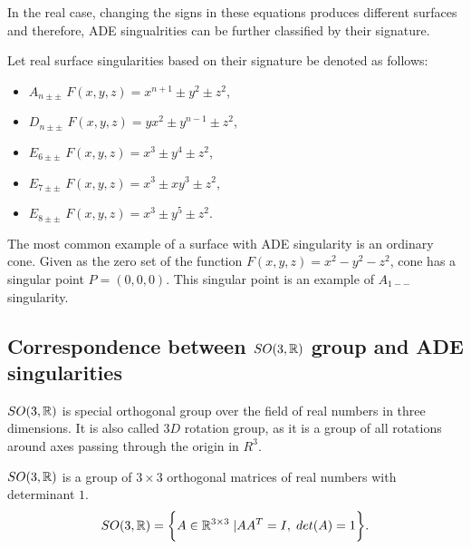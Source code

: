 In the real case, changing the signs in these equations produces different
surfaces and therefore, ADE singualrities can be further classified by their
signature.

\begin{definition}
    Let real surface singularities based on their signature be denoted as follows:
    \begin{itemize}
        \item $A_{n\pm\pm}$ \hspace{5mm} $F(x,y,z)=x^{n+1}\pm y^2\pm z^2$,
              
        \item $D_{n\pm\pm}$ \hspace{5mm} $F(x,y,z)=yx^2\pm y^{n-1}\pm z^2$,
        
        \item $E_{6\pm\pm}$ \hspace{5mm} $F(x,y,z)=x^3\pm y^4\pm z^2$,
        
        \item $E_{7\pm\pm}$ \hspace{5mm} $F(x,y,z)=x^3\pm xy^3\pm z^2$,
        
        \item $E_{8\pm\pm}$ \hspace{5mm} $F(x,y,z)=x^3\pm y^5\pm z^2$.
        \end{itemize}
\end{definition}

The most common example of a surface with ADE singularity is an ordinary cone.
Given as the zero set of the function $F(x, y, z)=x^2-y^2-z^2$, cone has
a singular point $P=(0, 0, 0)$. This singular point is an example of $A_{1--}$
singularity.

\subsection{Correspondence between $SO(3,\mathbb{R})$ group and ADE singularities}
\label{subs2.2.2}
$SO(3, \mathbb{R})$ is special orthogonal group over the field of real numbers 
in three dimensions. It is also called $3D$ rotation group, as it is a group
of all rotations around axes passing through the origin in $R^3$.
\begin{definition}
    $SO(3, \mathbb{R})$ is a group of $3\times3$ orthogonal matrices
    of real numbers with determinant $1$.
    $$SO(3, \mathbb{R}) = \bigg\{A\in\mathbb{R}^{3\times3} \hspace{1mm} | AA^T=I ,\hspace{1mm} det(A)=1\bigg\}.$$
\end{definition}

